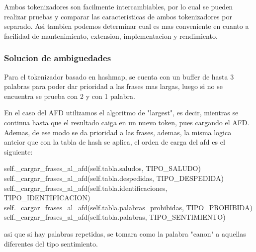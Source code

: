 Ambos tokenizadores son facilmente intercambiables, por lo cual se pueden realizar pruebas y
comparar las caracteristicas de ambos tokenizadores por separado. Asi tambien podemos
determinar cual es mas conveniente en cuanto a facilidad de mantenimiento, extension,
implementacion y rendimiento.

\subsubsection{Solucion de ambiguedades}

Para el tokenizador basado en hashmap, se cuenta con un buffer de hasta 3 palabras para poder
dar prioridad a las frases mas largas, luego si no se encuentra se prueba con 2 y con 1
palabra.

En el caso del AFD utilizamos el algoritmo de "largest", es decir, mientras se continua hasta
que el resultado caiga en un nuevo token, pues cargando el AFD. Ademas, de ese modo se da
prioridad a las frases, ademas, la misma logica anteior que con la tabla de hash se aplica, el
orden de carga del afd es el siguiente:

        self._cargar_frases_al_afd(self.tabla.saludos, TIPO_SALUDO)
        self._cargar_frases_al_afd(self.tabla.despedidas, TIPO_DESPEDIDA)
        self._cargar_frases_al_afd(self.tabla.identificaciones, TIPO_IDENTIFICACION)
        self._cargar_frases_al_afd(self.tabla.palabras_prohibidas, TIPO_PROHIBIDA)
        self._cargar_frases_al_afd(self.tabla.palabras, TIPO_SENTIMIENTO)

asi que si hay palabras repetidas, se tomara como la palabra "canon" a aquellas diferentes del
tipo sentimiento.


